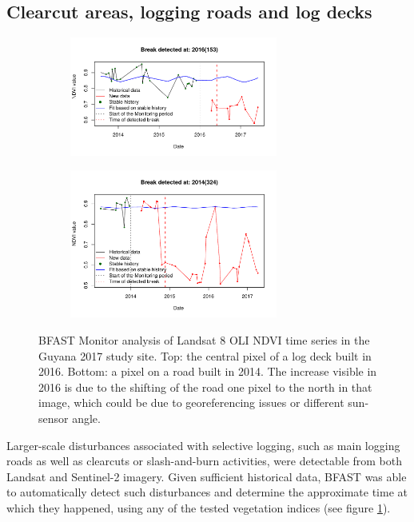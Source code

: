 \documentclass[a4paper,12pt]{scrbook}
\begin{document}
\subsection{Clearcut areas, logging roads and log decks}

\begin{figure}
  \begin{subfigure}{\textwidth}
    \centering
    \includegraphics[width=0.75\textwidth]{thesis-figures/11-guyana17-landsat-ndvi-deck-b}
  \end{subfigure}
  \begin{subfigure}{\textwidth}
    \centering
    \includegraphics[width=0.75\textwidth]{thesis-figures/12-guyana17-landsat-ndvi-road-b}
  \end{subfigure}
  \caption{\ac{BFAST} Monitor analysis of Landsat 8 \ac{OLI} \ac{NDVI} time series in the Guyana 2017 study site. Top: the central pixel of a log deck built in 2016. Bottom: a pixel on a road built in 2014. The increase visible in 2016 is due to the shifting of the road one pixel to the north in that image, which could be due to georeferencing issues or different sun-sensor angle.}
  \label{fig-guyana17-landsat-ndvi-deck}
\end{figure}

Larger-scale disturbances associated with selective logging, such as main logging roads as well as clearcuts or slash-and-burn activities, were detectable from both Landsat and Sentinel-2 imagery. Given sufficient historical data, \ac{BFAST} was able to automatically detect such disturbances and determine the approximate time at which they happened, using any of the tested vegetation indices (see figure \ref{fig-guyana17-landsat-ndvi-deck}).
\end{document}
